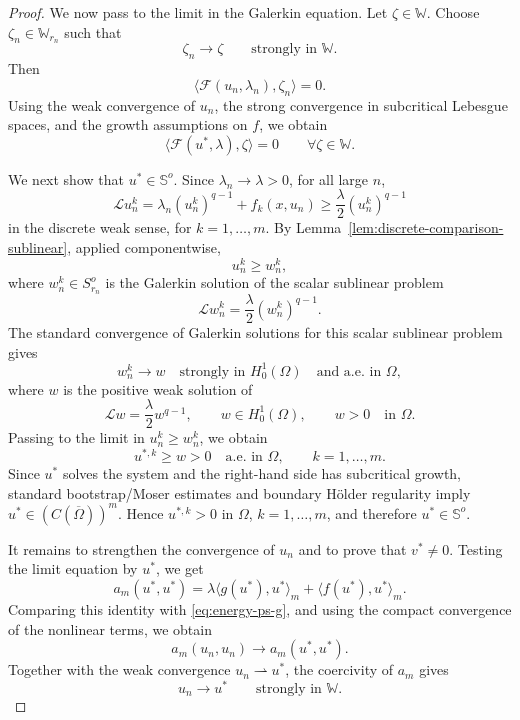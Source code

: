 \documentclass[10pt,a4paper]{amsart}
\begin{document}
\begin{proof}
	We now pass to the limit in the Galerkin equation. Let
	\(\zeta\in\mathbb W\). Choose \(\zeta_n\in\mathbb W_{r_n}\) such that
	\[
	\zeta_n\to\zeta
	\qquad\text{strongly in }\mathbb W .
	\]
	Then
	\[
	\langle\mathcal F(u_n,\lambda_n),\zeta_n\rangle=0.
	\]
	Using the weak convergence of \(u_n\), the strong convergence in
	subcritical Lebesgue spaces, and the growth assumptions on \(f\), we obtain
	\[
	\langle\mathcal F(u^*,\lambda),\zeta\rangle=0
	\qquad \forall \zeta\in\mathbb W .
	\]
	
	We next show that \(u^*\in\mathbb S^o\). Since
	\(\lambda_n\to\lambda>0\), for all large \(n\),
	\[
	\mathcal L u_n^k
	=
	\lambda_n(u_n^k)^{q-1}+f_k(x,u_n)
	\ge
	\frac{\lambda}{2}(u_n^k)^{q-1}
	\]
	in the discrete weak sense, for \(k=1,\ldots,m\). By
	Lemma~\ref{lem:discrete-comparison-sublinear}, applied componentwise,
	\[
	u_n^k\ge w_n^k,
	\]
	where \(w_n^k\in S_{r_n}^o\) is the Galerkin solution of the scalar
	sublinear problem
	\[
	\mathcal L w_n^k=\frac{\lambda}{2}(w_n^k)^{q-1}.
	\]
	The standard convergence of Galerkin solutions for this scalar sublinear
	problem gives
	\[
	w_n^k\to w
	\quad\text{strongly in }H_0^1(\Omega)
	\quad\text{and a.e. in }\Omega,
	\]
	where \(w\) is the positive weak solution of
	\[
	\mathcal L w=\frac{\lambda}{2}w^{q-1},
	\qquad
	w\in H_0^1(\Omega),
	\qquad
	w>0 \quad\text{in }\Omega .
	\]
	Passing to the limit in \(u_n^k\ge w_n^k\), we obtain
	\[
	u^{*,k}\ge w>0
	\quad\text{a.e. in }\Omega,
	\qquad k=1,\ldots,m .
	\]
	Since \(u^*\) solves the system and the right-hand side has subcritical
	growth, standard bootstrap/Moser estimates and boundary H\"older regularity
	imply \(u^*\in(C(\overline\Omega))^m\). Hence
	\(u^{*,k}>0\) in \(\Omega\), \(k=1,\ldots,m\), and therefore
	\(u^*\in\mathbb S^o\).
	
	It remains to strengthen the convergence of \(u_n\) and to prove that
	\(v^*\ne0\). Testing the limit equation by \(u^*\), we get
	\[
	a_m(u^*,u^*)
	=
	\lambda\langle g(u^*),u^*\rangle_m
	+
	\langle f(u^*),u^*\rangle_m .
	\]
	Comparing this identity with \eqref{eq:energy-ps-g}, and using the compact
	convergence of the nonlinear terms, we obtain
	\[
	a_m(u_n,u_n)\to a_m(u^*,u^*) .
	\]
	Together with the weak convergence \(u_n\rightharpoonup u^*\), the
	coercivity of \(a_m\) gives
	\[
	u_n\to u^*
	\qquad\text{strongly in }\mathbb W .
	\]
	

\end{proof}
\end{document}
